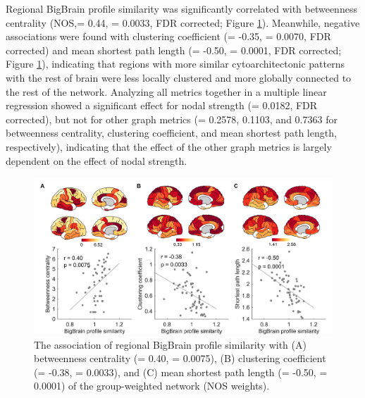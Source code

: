 \begin{refsection}
Regional BigBrain profile similarity was significantly correlated with betweenness centrality (NOS,\rval = 0.44, \pval = 0.0033, FDR corrected; Figure \ref{bigbrainFig6}). Meanwhile, negative associations were found with clustering coefficient (\rval = -0.35, \pval = 0.0070, FDR corrected) and mean shortest path length (\rval = -0.50, \pval = 0.0001, FDR corrected; Figure \ref{bigbrainFig6}), indicating that regions with more similar cytoarchitectonic patterns with the rest of brain were less locally clustered and more globally connected to the rest of the network. Analyzing all metrics together in a multiple linear regression showed a significant effect for nodal strength (\pval = 0.0182, FDR corrected), but not for other graph metrics (\pval = 0.2578, 0.1103, and 0.7363 for betweenness centrality, clustering coefficient, and mean shortest path length, respectively), indicating that the effect of the other graph metrics is largely dependent on the effect of nodal strength.

\begin{figure}[h]
    \centering
    \includegraphics[width=\linewidth]{images/thesis_bb_fig6.jpg}
    \caption{The association of regional BigBrain profile similarity with (A) betweenness centrality (\rval = 0.40, \pval = 0.0075), (B) clustering coefficient (\rval = -0.38, \pval = 0.0033), and (C) mean shortest path length (\rval = -0.50, \pval = 0.0001) of the group-weighted network (NOS weights).}
    \label{bigbrainFig6}
\end{figure}



\end{refsection}
